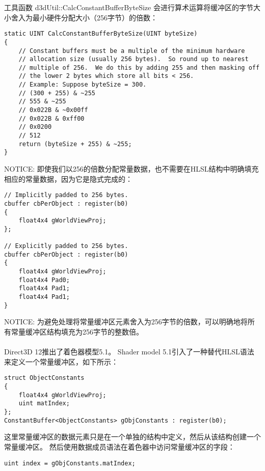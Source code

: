 \begin{flushleft}
工具函数 d3dUtil::CalcConstantBufferByteSize 会进行算术运算将缓冲区的字节大小舍入为最小硬件分配大小（256字节）的倍数：\\
\begin{lstlisting}
static UINT CalcConstantBufferByteSize(UINT byteSize)
{
    // Constant buffers must be a multiple of the minimum hardware
    // allocation size (usually 256 bytes).  So round up to nearest
    // multiple of 256.  We do this by adding 255 and then masking off
    // the lower 2 bytes which store all bits < 256.
    // Example: Suppose byteSize = 300.
    // (300 + 255) & ~255
    // 555 & ~255
    // 0x022B & ~0x00ff
    // 0x022B & 0xff00
    // 0x0200
    // 512
    return (byteSize + 255) & ~255;
}
\end{lstlisting}
NOTICE: 即使我们以256的倍数分配常量数据，也不需要在HLSL结构中明确填充相应的常量数据，因为它是隐式完成的：\\
\begin{lstlisting}
// Implicitly padded to 256 bytes.
cbuffer cbPerObject : register(b0)
{
    float4x4 gWorldViewProj;
};

// Explicitly padded to 256 bytes.
cbuffer cbPerObject : register(b0)
{
    float4x4 gWorldViewProj;
    float4x4 Pad0;
    float4x4 Pad1;
    float4x4 Pad1;
}
\end{lstlisting}
NOTICE: 为避免处理将常量缓冲区元素舍入为256字节的倍数，可以明确地将所有常量缓冲区结构填充为256字节的整数倍。\\
~\\
Direct3D 12推出了着色器模型5.1。 Shader model 5.1引入了一种替代HLSL语法来定义一个常量缓冲区，如下所示：\\
\begin{lstlisting}
struct ObjectConstants
{
    float4x4 gWorldViewProj;
    uint matIndex;
};
ConstantBuffer<ObjectConstants> gObjConstants : register(b0);
\end{lstlisting}
这里常量缓冲区的数据元素只是在一个单独的结构中定义，然后从该结构创建一个常量缓冲区。 然后使用数据成员语法在着色器中访问常量缓冲区的字段：\\
\begin{lstlisting}
uint index = gObjConstants.matIndex;
\end{lstlisting}
\end{flushleft}

